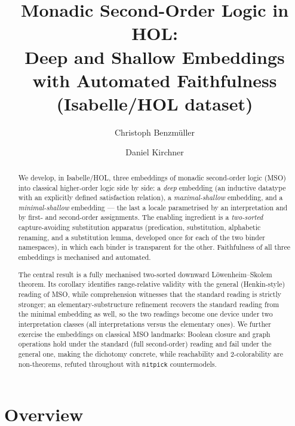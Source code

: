 \documentclass[11pt,a4paper]{article}
\begin{document}
\title{Monadic Second-Order Logic in HOL:\\
       Deep and Shallow Embeddings with Automated Faithfulness\\
       (Isabelle/HOL dataset)}
\author{Christoph Benzm\"uller \and Daniel Kirchner}
\maketitle

\begin{abstract}
We develop, in Isabelle/HOL, three embeddings of monadic second-order logic
(MSO) into classical higher-order logic side by side: a \emph{deep} embedding
(an inductive datatype with an explicitly defined satisfaction relation), a
\emph{maximal-shallow} embedding, and a \emph{minimal-shallow} embedding --- the
last a locale parametrised by an interpretation and by first- and second-order
assignments. The enabling ingredient is a \emph{two-sorted} capture-avoiding
substitution apparatus (predication, substitution, alphabetic renaming, and a
substitution lemma, developed once for each of the two binder namespaces), in
which each binder is transparent for the other. Faithfulness of all three
embeddings is mechanised and automated.

The central result is a fully mechanised two-sorted downward
L\"owenheim--Skolem theorem. Its corollary identifies range-relative validity
with the general (Henkin-style) reading of MSO, while comprehension witnesses
that the standard reading is strictly stronger; an elementary-substructure
refinement recovers the standard reading from the minimal embedding as well, so
the two readings become one device under two interpretation classes (all
interpretations versus the elementary ones). We further exercise the embeddings
on classical MSO landmarks: Boolean closure and graph operations hold under the
standard (full second-order) reading and fail under the general one, making the
dichotomy concrete, while reachability and $2$-colorability are non-theorems,
refuted throughout with \texttt{nitpick} countermodels.
\end{abstract}

\setcounter{tocdepth}{2}
\tableofcontents
\newpage

\section{Overview}
\end{document}
